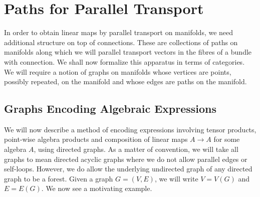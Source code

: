 \documentclass[./Thick_TQFTs_and_Quantum_Information.tex]{subfiles}
\begin{document}
\section{Paths for Parallel Transport}

In order to obtain linear maps by parallel transport on manifolds, we need
additional structure on top of connections. These are collections of paths on
manifolds along which we will parallel transport vectors in the fibres of a
bundle with connection. We shall now formalize this apparatus in terms of
categories. We will require a notion of graphs on manifolds whose vertices are
points, possibly repeated, on the manifold and whose edges are paths on the
manifold.

\subsection{Graphs Encoding Algebraic Expressions}

We will now describe a method of encoding expressions involving tensor products,
point-wise algebra products and composition of linear maps $A \to A$ for some
algebra $A$, using directed graphs. As a matter of convention, we will take all
graphs to mean directed acyclic graphs where we do not allow parallel edges or
self-loops. However, we do allow the underlying undirected graph of any directed
graph to be a forest. Given a graph $G = (V, E)$, we will write $V = V(G)$ and
$E = E(G)$. We now see a motivating example.
\end{document}
